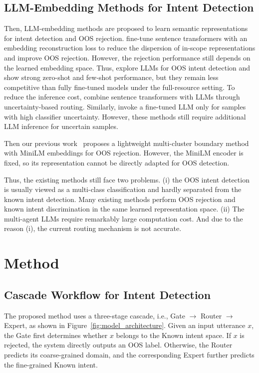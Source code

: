 \documentclass[11pt]{article}
\begin{document}
\subsection{LLM-Embedding Methods for Intent Detection}
Then, LLM-embedding methods are proposed to learn semantic representations for intent detection and OOS rejection. \citet{zhang2024new} fine-tune sentence transformers with an embedding reconstruction loss to reduce the dispersion of in-scope representations and improve OOS rejection. However, the rejection performance still depends on the learned embedding space. Thus, \citet{wang2024beyond} explore LLMs for OOS intent detection and show strong zero-shot and few-shot performance, but they remain less competitive than fully fine-tuned models under the full-resource setting. To reduce the inference cost, \citet{arora2024intent} combine sentence transformers with LLMs through uncertainty-based routing. Similarly, \citet{zaera2025efficient} invoke a fine-tuned LLM only for samples with high classifier uncertainty. However, these methods still require additional LLM inference for uncertain samples.

Then our previous work~\citep{xu2026multi} proposes a lightweight multi-cluster boundary method with MiniLM embeddings for OOS rejection. However, the MiniLM encoder is fixed, so its representation cannot be directly adapted for OOS detection.

Thus, the existing methods still face two problems. (i) the OOS intent detection is usually viewed as a multi-class classification and hardly separated from the known intent detection. Many existing methods perform OOS rejection and known intent discrimination in the same learned representation space. (ii) The multi-agent LLMs require remarkably large computation cost. And due to the reason (i), the current routing mechanism is not accurate. 

\section{Method}

\subsection{Cascade Workflow for Intent Detection}
\label{sec:cascade}

The proposed method uses a three-stage cascade, i.e., Gate $\rightarrow$ Router $\rightarrow$ Expert, as shown in Figure~\ref{fig:model_architecture}. Given an input utterance $x$, the Gate first determines whether $x$ belongs to the Known intent space. If $x$ is rejected, the system directly outputs an OOS label. Otherwise, the Router predicts its coarse-grained domain, and the corresponding Expert further predicts the fine-grained Known intent.
\end{document}
